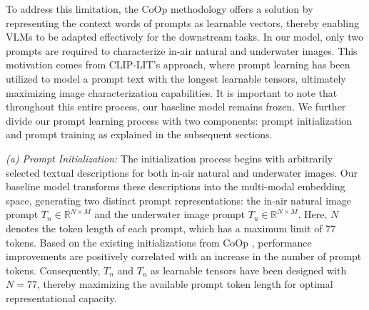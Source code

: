 \documentclass[3p,12pt,authoryear]{elsarticle}
\begin{document}
To address this limitation, the CoOp \cite{10.1007/s11263-022-01653-1} methodology offers a solution by representing the context words of prompts as learnable vectors, thereby enabling VLMs to be adapted effectively for the downstream tasks. In our model, only two prompts are required to characterize in-air natural and underwater images. This motivation comes from CLIP-LIT's \cite{Liang2023IterativePL} approach, where prompt learning has been utilized to model a prompt text with the longest learnable tensors, ultimately maximizing image characterization capabilities.
It is important to note that throughout this entire process, our baseline model remains frozen. We further divide our prompt learning process with two components: prompt initialization and prompt training as explained in the subsequent sections.

{\textit{(a) Prompt Initialization:}}
The initialization process begins with arbitrarily selected textual descriptions for both in-air natural and underwater images. Our baseline model transforms these descriptions into the multi-modal embedding space, generating two distinct prompt representations: the in-air natural image prompt $T_n \in \mathbb{R}^{N \times M}$ and the underwater image prompt $T_u \in \mathbb{R}^{N \times M}$. Here, $N$ denotes the token length of each prompt, which has a maximum limit of 77 tokens. Based on the existing initializations from CoOp \cite{10.1007/s11263-022-01653-1}, performance improvements are positively correlated with an increase in the number of prompt tokens. Consequently, $T_n$ and $T_u$ as learnable tensors have been designed with $N = 77$, thereby maximizing the available prompt token length for optimal representational capacity.
\end{document}
